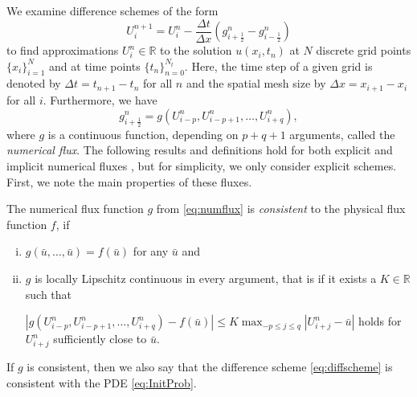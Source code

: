 \documentclass[final,11pt, times, linenumber, nopreprintline]{elsarticle}
\newcommand{\R}{\mathbb{R}}
\newcommand{\bu}{ u}
\newcommand{\bg}{ g}
\renewcommand{\bf}{ f}
\begin{document}
We examine difference schemes of the form
\begin{equation}
	U_i^{n+1} = U_i^n - \frac{\Delta t}{\Delta x}\left(\bg_{i+\frac{1}{2}}^n - \bg_{i-\frac{1}{2}}^n \right)
	\label{eq:diffscheme}
\end{equation}
to find approximations $U_i^n \in \R$ to the solution $\bu(x_i,t_n)$ at $N$ discrete grid points $\lbrace x_i\rbrace_{i=1}^N$ and at time points $\lbrace t_n \rbrace_{n=0}^{N_t}$. %
Here, the time step of a given grid is denoted by $\Delta t = t_{n+1}-t_n$ for all $n$ and the spatial mesh size by $\Delta x=x_{i+1}-x_{i}$ for all $i$. Furthermore, we have
\begin{equation}
	\bg_{i+ \frac{1}{2}}^n = \bg(U^n_{i-p}, U^n_{i-p+1}, \dots, U^n_{i+q}),
	\label{eq:numflux}
\end{equation}
where $\bg$ is a continuous function, depending on $p + q + 1$ arguments, called the \textit{numerical flux}. The following results and definitions hold for both explicit and implicit numerical fluxes \cite[p. 44]{kroner_numerical_1997}, but for simplicity, we only consider explicit schemes. First, we note the main properties of these fluxes.
 
\begin{dfn}[Consistency]
	\label{def:cons}
The numerical flux function $\bg$ from \eqref{eq:numflux} is \textit{consistent} to the physical flux function $\bf$, if
\begin{enumerate}[i.]
\item  $g(\bar{\bu},\dots,\bar{\bu}) = f(\bar{\bu})$ for any $\bar{u}$ and
\item $\bg$ is locally Lipschitz continuous in every argument, that is if it exists a $K \in \R$ such that

$|\bg(U^n_{i-p}, U^n_{i-p+1}, \dots, U^n_{i+q})-\bf(\bar{\bu})| \leq K \max_{-p \leq j \leq q} |U^n_{i+j} - \bar{\bu}|$ holds
for $U^n_{i+j}$ sufficiently close to $\bar{\bu}$.
\end{enumerate}
\end{dfn}
If $g$ is consistent, then we also say that the difference scheme \eqref{eq:diffscheme} is consistent with the PDE \eqref{eq:InitProb}.
\end{document}
